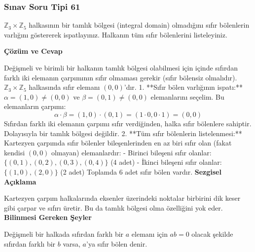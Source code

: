 \documentclass[11pt, a4paper]{article}
\newenvironment{cozum}{
    \vspace{0.5cm}
    \noindent\textcolor{green!60!black}{\faCheckCircle\enspace \textbf{\Large Çözüm ve Cevap}}\par\vspace{0.2cm}
}{}
\newenvironment{sezgisel}{
    \vspace{0.5cm}
    \noindent\textcolor{orange!80!black}{\faLightbulb\enspace \textbf{\Large Sezgisel Açıklama}}\par\vspace{0.2cm}
    \itshape
}{}
\newenvironment{bilgi}{
    \vspace{0.5cm}
    \noindent\textcolor{red!70!black}{\faExclamationTriangle\enspace \textbf{\Large Bilinmesi Gereken Şeyler}}\par\vspace{0.2cm}
}{}
\begin{document}
\subsubsection{Sınav Soru Tipi 61}
\begin{sinavbox}
$\mathbb{Z}_{3} \times \mathbb{Z}_{5}$ halkasının bir tamlık bölgesi (integral domain) olmadığını sıfır bölenlerin varlığını göstererek ispatlayınız. Halkanın tüm sıfır bölenlerini listeleyiniz.
\end{sinavbox}
\begin{cozum}
Değişmeli ve birimli bir halkanın tamlık bölgesi olabilmesi için içinde sıfırdan farklı iki elemanın çarpımının sıfır olmaması gerekir (sıfır bölensiz olmalıdır).
$\mathbb{Z}_3 \times \mathbb{Z}_5$ halkasında sıfır elemanı $(0, 0)$'dır.
1. **Sıfır bölen varlığının ispatı:**
   $\alpha = (1, 0) \neq (0, 0)$ ve $\beta = (0, 1) \neq (0, 0)$ elemanlarını seçelim.
   Bu elemanların çarpımı:
   \[ \alpha \cdot \beta = (1, 0) \cdot (0, 1) = (1\cdot 0, 0\cdot 1) = (0, 0) \]
   Sıfırdan farklı iki elemanın çarpımı sıfır verdiğinden, halka sıfır bölenlere sahiptir. Dolayısıyla bir tamlık bölgesi değildir.
2. **Tüm sıfır bölenlerin listelenmesi:**
   Kartezyen çarpımda sıfır bölenler bileşenlerinden en az biri sıfır olan (fakat kendisi $(0,0)$ olmayan) elemanlardır:
   - Birinci bileşeni sıfır olanlar: $\{ (0, 1), (0, 2), (0, 3), (0, 4) \}$ (4 adet)
   - İkinci bileşeni sıfır olanlar: $\{ (1, 0), (2, 0) \}$ (2 adet)
   Toplamda 6 adet sıfır bölen vardır.
\end{cozum}
\begin{sezgisel}
Kartezyen çarpım halkalarında eksenler üzerindeki noktalar birbirini dik keser gibi çarpar ve sıfırı üretir. Bu da tamlık bölgesi olma özelliğini yok eder.
\end{sezgisel}
\begin{bilgi}
Değişmeli bir halkada sıfırdan farklı bir $a$ elemanı için $ab = 0$ olacak şekilde sıfırdan farklı bir $b$ varsa, $a$'ya sıfır bölen denir.
\end{bilgi}

\newpage
\end{document}
